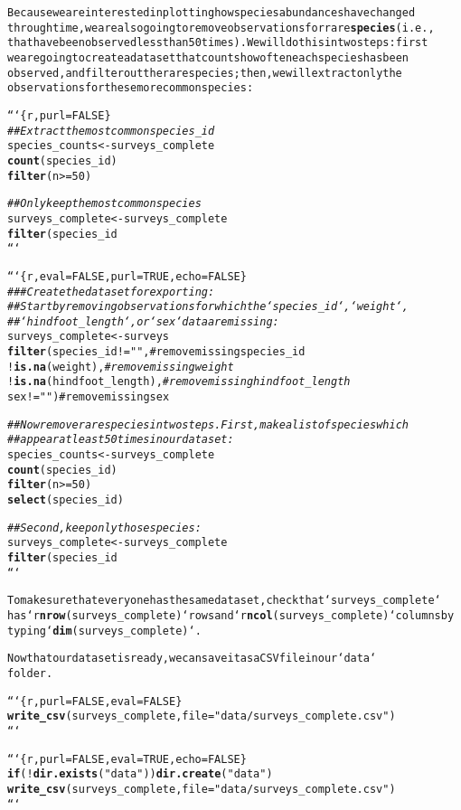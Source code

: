 \documentclass{article}\usepackage[]{graphicx}\usepackage[]{xcolor}
\makeatletter
\newcommand{\hlstr}[1]{\textcolor[rgb]{0.192,0.494,0.8}{#1}}%
\newcommand{\hlcom}[1]{\textcolor[rgb]{0.678,0.584,0.686}{\textit{#1}}}%
\newcommand{\hlkwd}[1]{\textcolor[rgb]{0.737,0.353,0.396}{\textbf{#1}}}%
\newenvironment{kframe}{%
 \def\at@end@of@kframe{}%
 \ifinner\ifhmode%
  \def\at@end@of@kframe{\end{minipage}}%
  \begin{minipage}{\columnwidth}%
 \fi\fi%
 \def\FrameCommand##1{\hskip\@totalleftmargin \hskip-\fboxsep
 \colorbox{shadecolor}{##1}\hskip-\fboxsep
     \hskip-\linewidth \hskip-\@totalleftmargin \hskip\columnwidth}%
 \MakeFramed {\advance\hsize-\width
   \@totalleftmargin\z@ \linewidth\hsize
   \@setminipage}}%
 {\par\unskip\endMakeFramed%
 \at@end@of@kframe}
\newenvironment{knitrout}{}{} %
\makeatother
\begin{document}
\begin{knitrout}
\begin{kframe}
\begin{alltt}
Because we are interested in plotting how species abundances have changed
through time, we are also going to remove observations for rare \hlkwd{species} (i.e.,
that have been observed less than 50 times). We will do this in two steps: first
we are going to create a data set that counts how often each species has been
observed, and filter out the rare species; then, we will extract only the
observations for these more common species:

```\{r, purl=FALSE\}
\hlcom{## Extract the most common species_id}
species_counts <- surveys_complete %>%
    \hlkwd{count}(species_id) %>%
    \hlkwd{filter}(n >= 50)

\hlcom{## Only keep the most common species}
surveys_complete <- surveys_complete %>%
  \hlkwd{filter}(species_id %in% species_counts$species_id)
```

```\{r, eval=FALSE, purl=TRUE, echo=FALSE\}
\hlcom{### Create the dataset for exporting:}
\hlcom{##  Start by removing observations for which the `species_id`, `weight`,}
\hlcom{##  `hindfoot_length`, or `sex` data are missing:}
surveys_complete <- surveys %>%
    \hlkwd{filter}(species_id != \hlstr{""},        # remove missing species_id
           !\hlkwd{is.na}(weight),                 \hlcom{# remove missing weight}
           !\hlkwd{is.na}(hindfoot_length),        \hlcom{# remove missing hindfoot_length}
           sex != \hlstr{""})                      # remove missing sex

\hlcom{##  Now remove rare species in two steps. First, make a list of species which}
\hlcom{##  appear at least 50 times in our dataset:}
species_counts <- surveys_complete %>%
    \hlkwd{count}(species_id) %>%
    \hlkwd{filter}(n >= 50) %>%
    \hlkwd{select}(species_id)

\hlcom{##  Second, keep only those species:}
surveys_complete <- surveys_complete %>%
    \hlkwd{filter}(species_id %in% species_counts$species_id)
```

To make sure that everyone has the same data set, check that `surveys_complete`
has `r \hlkwd{nrow}(surveys_complete)` rows and `r \hlkwd{ncol}(surveys_complete)` columns by
typing `\hlkwd{dim}(surveys_complete)`.

Now that our data set is ready, we can save it as a CSV file in our `data`
folder.

```\{r, purl=FALSE, eval=FALSE\}
\hlkwd{write_csv}(surveys_complete, file = \hlstr{"data/surveys_complete.csv"})
```

```\{r, purl=FALSE, eval=TRUE, echo=FALSE\}
\hlkwd{if} (!\hlkwd{dir.exists}(\hlstr{"data"})) \hlkwd{dir.create}(\hlstr{"data"})
\hlkwd{write_csv}(surveys_complete, file = \hlstr{"data/surveys_complete.csv"})
```



\end{alltt}
\end{kframe}
\end{knitrout}
\end{document}

